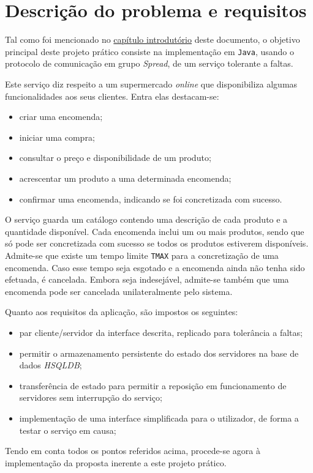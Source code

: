 \documentclass[a4paper]{report}
\begin{document}
\chapter{Descrição do problema e requisitos} \label{ch:ProblemDescriptionRequirements}
\large{
	Tal como foi mencionado no \hyperref[ch:Introduction]{capítulo introdutório} deste documento, o objetivo principal deste projeto prático consiste na implementação em \texttt{Java}, usando o protocolo de comunicação em grupo \textit{Spread}, de um serviço tolerante a faltas.

	Este serviço diz respeito a um supermercado \textit{online} que disponibiliza algumas funcionalidades aos seus clientes. Entra elas destacam-se:
	\begin{itemize}
		\item criar uma encomenda;
		\item iniciar uma compra;
		\item consultar o preço e disponibilidade de um produto;
		\item acrescentar um produto a uma determinada encomenda;
		\item confirmar uma encomenda, indicando se foi concretizada com sucesso.
	\end{itemize}

	O serviço guarda um catálogo contendo uma descrição de cada produto e a quantidade disponível.
	Cada encomenda inclui um ou mais produtos, sendo que só pode ser concretizada com sucesso se todos os produtos estiverem disponíveis.
	Admite-se que existe um tempo limite \texttt{TMAX} para a concretização de uma encomenda. Caso esse tempo seja esgotado e a encomenda ainda não tenha sido efetuada, é cancelada. Embora seja indesejável, admite-se também que uma encomenda pode ser cancelada unilateralmente pelo sistema.

	Quanto aos requisitos da aplicação, são impostos os seguintes:
	\begin{itemize}
		\item par cliente/servidor da interface descrita, replicado para tolerância a faltas;
		\item permitir o armazenamento persistente do estado dos servidores na base de dados \textit{HSQLDB};
		\item transferência de estado para permitir a reposição em funcionamento de servidores sem interrupção do serviço;
		\item implementação de uma interface simplificada para o utilizador, de forma a testar o serviço em causa;
	\end{itemize}

	Tendo em conta todos os pontos referidos acima, procede-se agora à implementação da proposta inerente a este projeto prático.
}
\end{document}
